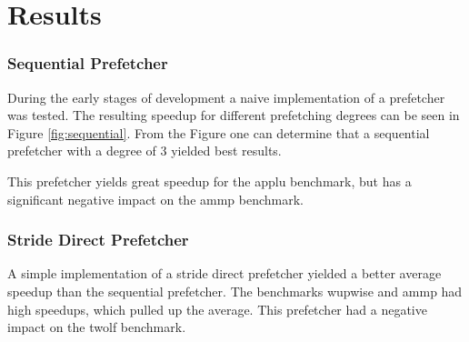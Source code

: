 \section{Results}
\label{sec:results}
%
\subsubsection{Sequential Prefetcher}
During the early stages of development a naive implementation of a prefetcher was tested.
The resulting speedup for different prefetching degrees can be seen in Figure \ref{fig:sequential}.
From the Figure one can determine that a sequential prefetcher with a degree of 3 yielded best results.

This prefetcher yields great speedup for the applu benchmark, but has a significant negative impact on the ammp benchmark.

\begin{figure*}
    \label{fig:sequential}
    
    \caption{Speedup of each benchmark as a function of degree for the sequential prefetcher.}
\end{figure*}



\subsubsection{Stride Direct Prefetcher}
A simple implementation of a stride direct prefetcher yielded a better average speedup than the sequential prefetcher.
The benchmarks wupwise and ammp had high speedups, which pulled up the average.
This prefetcher had a negative impact on the twolf benchmark.

